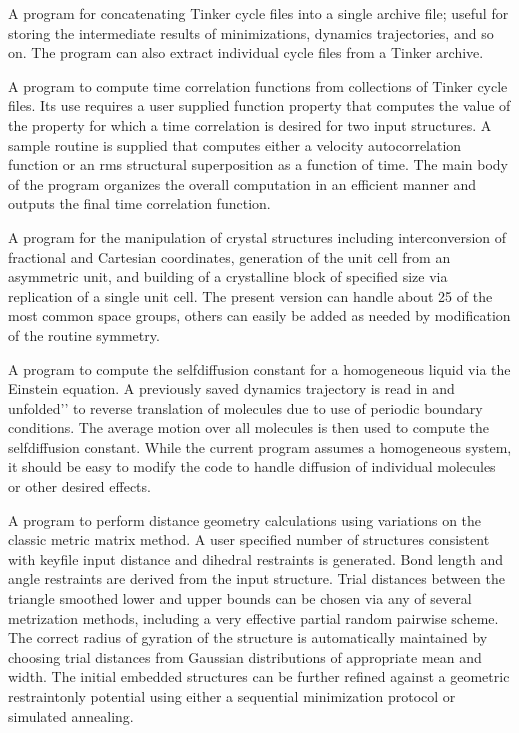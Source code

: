 \documentclass[letterpaper,11pt,english]{sphinxmanual}
\begin{document}

A program for concatenating Tinker cycle files into a single archive file; useful for storing the intermediate results of minimizations, dynamics trajectories, and so on. The program can also extract individual cycle files from a Tinker archive.


A program to compute time correlation functions from collections of Tinker cycle files. Its use requires a user supplied function property that computes the value of the property for which a time correlation is desired for two input structures. A sample routine is supplied that computes either a velocity autocorrelation function or an rms structural superposition as a function of time. The main body of the program organizes the overall computation in an efficient manner and outputs the final time correlation function.


A program for the manipulation of crystal structures including interconversion of fractional and Cartesian coordinates, generation of the unit cell from an asymmetric unit, and building of a crystalline block of specified size via replication of a single unit cell. The present version can handle about 25 of the most common space groups, others can easily be added as needed by modification of the routine symmetry.


A program to compute the self\sphinxhyphen{}diffusion constant for a homogeneous liquid via the Einstein equation. A previously saved dynamics trajectory is read in and {\color{red}\bfseries{}\textasciigrave{}\textasciigrave{}}unfolded’’ to reverse translation of molecules due to use of periodic boundary conditions. The average motion over all molecules is then used to compute the self\sphinxhyphen{}diffusion constant. While the current program assumes a homogeneous system, it should be easy to modify the code to handle diffusion of individual molecules or other desired effects.


A program to perform distance geometry calculations using variations on the classic metric matrix method. A user specified number of structures consistent with keyfile input distance and dihedral restraints is generated. Bond length and angle restraints are derived from the input structure. Trial distances between the triangle smoothed lower and upper bounds can be chosen via any of several metrization methods, including a very effective partial random pairwise scheme. The correct radius of gyration of the structure is automatically maintained by choosing trial distances from Gaussian distributions of appropriate mean and width. The initial embedded structures can be further refined against a geometric restraint\sphinxhyphen{}only potential using either a sequential minimization protocol or simulated annealing.
\end{document}

